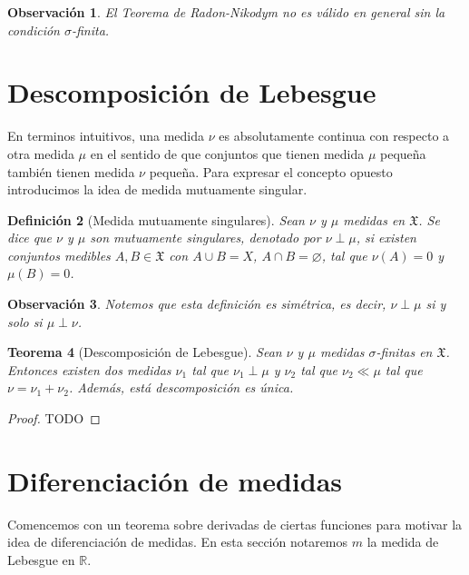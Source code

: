 \documentclass[12pt,a4paper]{article}
\theoremstyle{profesional}
\newtheorem{teorema}{Teorema}[section]
\theoremstyle{definicion-style}
\newtheorem{definicion}[teorema]{Definición}
\newtheorem{observacion}[teorema]{Observación}
\newcommand{\R}{\mathbb{R}}
\newcommand{\X}{\mathfrak{X}}
\begin{document}
\begin{observacion}
    El Teorema de Radon-Nikodym no es válido en general sin la condición \(\sigma \)-finita.
\end{observacion}

\section{Descomposición de Lebesgue}

En terminos intuitivos, una medida \( \nu \) es absolutamente continua con respecto a otra medida \( \mu \) en el sentido de que conjuntos que tienen medida \( \mu \)
pequeña también tienen medida \( \nu \) pequeña.
Para expresar el concepto opuesto introducimos la idea de medida mutuamente singular.

\begin{definicion}[Medida mutuamente singulares]
    Sean \( \nu \) y \( \mu \) medidas en \( \X \). Se dice que \( \nu \) y \( \mu \) son mutuamente singulares, denotado por \( \nu \perp \mu \),
    si existen conjuntos medibles \( A, B \in \X \) con \( A \cup B = X \), \( A \cap B = \varnothing \),
    tal que \( \nu(A) = 0 \) y \( \mu(B) = 0 \).
\end{definicion}

\begin{observacion}
    Notemos que esta definición es simétrica, es decir, \( \nu \perp \mu \) si y solo si \( \mu \perp \nu \).
\end{observacion}

\begin{teorema}[Descomposición de Lebesgue]
    Sean \( \nu \) y \( \mu \) medidas \( \sigma \)-finitas en \( \X \).
    Entonces existen dos medidas \( \nu_1 \) tal que \( \nu_1 \perp \mu \) y \( \nu_2 \) tal que \( \nu_2 \ll \mu \) tal que \( \nu = \nu_1 + \nu_2 \).
    Además, está descomposición es única.
\end{teorema}
\begin{proof}
    TODO
\end{proof}

\section{Diferenciación de medidas}

Comencemos con un teorema sobre derivadas de ciertas funciones para motivar la idea de diferenciación de medidas. En esta sección notaremos \( m \)
la medida de Lebesgue en \( \R \).
\end{document}
